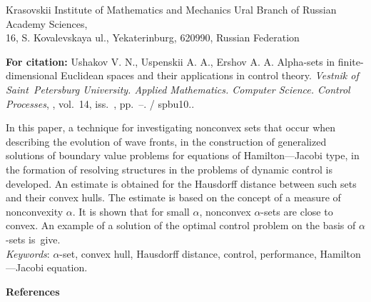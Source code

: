 
{\normalsize

\vskip 6mm


}

\vskip 2mm

{\small


\vskip 2mm

{\footnotesize \noindent Krasovskii Institute of Mathematics and
Mechanics Ural Branch of Russian Academy Sciences,\\ 16, S.
Kovalevskaya ul., Yekaterinburg, 620990, Russian Federation

}

\vskip3mm

\noindent \textbf{For citation:}  Ushakov V. N., Uspenskii A. A.,
Ershov A. A. Alpha-sets in finite-dimensional Euclidean spaces and
their applications in control theory. {\it Vestnik of
Saint~Petersburg University. Applied Mathematics. Computer
Science. Control Processes}, \issueyear, vol.~14, iss.~\issuenum,
pp.~\pageref{p7}--\pageref{p7e}.
\doivyp/\enskip%
\!\!\!spbu10.\issueyear.

\vskip3mm

{\leftskip=7mm\noindent In this paper, a technique for
investigating nonconvex sets that occur when describing the
evolution of wave fronts, in the construction of generalized
solutions of boundary value problems for equations of
Hamilton---Jacobi type, in the formation of resolving structures
in the problems of dynamic control is developed. An estimate is
obtained for the Hausdorff distance between such sets and their
convex hulls. The estimate is based on the concept of a measure of
nonconvexity $\alpha$. It is shown that for small $\alpha$,
nonconvex $\alpha$-sets are close to convex. An example of a
solution
of the optimal control problem on the basis of $\alpha$-sets is~give.\\[1mm]
\textit{Keywords}: $\alpha$-set, convex hull, Hausdorff distance,
control, performance, Hamilton---Jacobi equation.
\par}

\vskip5mm

\noindent \textbf{References} }

\vskip 2mm

